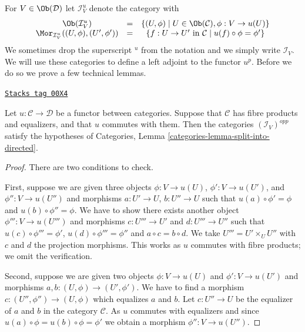\medskip\noindent
For $V \in \Ob(\mathcal{D})$ let $\mathcal{I}^u_V$
denote the category with
\begin{equation}
\label{equation-colim-category}
\begin{matrix}
\Ob(\mathcal{I}^u_V)
&
=
&
\{
(U, \phi)
\mid
U \in \Ob(\mathcal{C}),
\phi : V \to u(U)
\}
\\
\Mor_{\mathcal{I}^u_V}((U, \phi), (U', \phi'))
&
=
&
\{
f : U \to U' \text{ in }\mathcal{C}
\mid
u(f) \circ \phi = \phi'
\}
\end{matrix}
\end{equation}
We sometimes drop the superscript ${}^u$ from the notation and we simply write
$\mathcal{I}_V$.
We will use these categories to define a left adjoint to the functor $u^p$.
Before we do so we prove a few technical lemmas.

\begin{lemma}
\label{sites-lemma-almost-directed}
\href{https://stacks.math.columbia.edu/tag/00X4}{\texttt{Stacks tag 00X4}}

Let $u : \mathcal{C} \to \mathcal{D}$ be a functor between categories.
Suppose that $\mathcal{C}$ has fibre products and equalizers, and that
$u$ commutes with them. Then the categories $(\mathcal{I}_V)^{opp}$
satisfy the hypotheses of
Categories, Lemma \ref{categories-lemma-split-into-directed}.
\end{lemma}

\begin{proof}
There are two conditions to check.

\medskip\noindent
First, suppose we are given three objects
$\phi : V \to u(U)$, $\phi' : V \to u(U')$, and $\phi'' : V \to u(U'')$
and morphisms $a : U' \to U$, $b : U'' \to U$ such that
$u(a) \circ \phi' = \phi$ and $u(b) \circ \phi'' = \phi$.
We have to show there exists another object $\phi''' : V \to u(U''')$
and morphisms $c : U''' \to U'$ and $d : U''' \to U''$ such that
$u(c) \circ \phi''' = \phi'$, $u(d) \circ \phi''' = \phi''$ and
$a \circ c = b \circ d$. We take $U''' = U' \times_U U''$
with $c$ and $d$ the projection morphisms. This works as $u$ commutes
with fibre products; we omit the verification.

\medskip\noindent
Second, suppose we are given two objects
$\phi : V \to u(U)$ and $\phi' : V \to u(U')$
and morphisms $a, b : (U, \phi) \to (U', \phi')$.
We have to find a morphism $c : (U'', \phi'') \to (U, \phi)$
which equalizes $a$ and $b$. Let $c : U'' \to U$ be the equalizer of
$a$ and $b$ in the category $\mathcal{C}$. As $u$ commutes
with equalizers and since $u(a) \circ \phi = u(b) \circ \phi = \phi'$
we obtain a morphism $\phi'' : V \to u(U'')$.
\end{proof}

